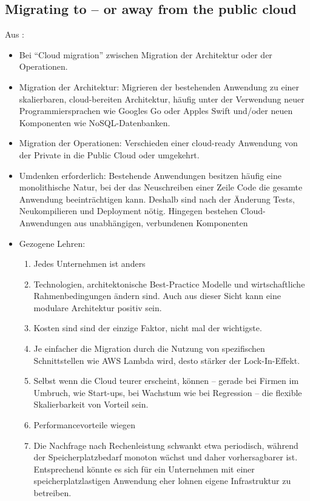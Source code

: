\subsection{Migrating to -- or away from the public cloud}
Aus :
\begin{itemize}
	\item Bei ``Cloud migration'' zwischen Migration der Architektur oder der Operationen.
	\item Migration der Architektur: Migrieren der bestehenden Anwendung zu einer skalierbaren, cloud-bereiten Architektur, häufig unter der Verwendung neuer Programmiersprachen wie Googles Go oder Apples Swift und/oder neuen Komponenten wie NoSQL-Datenbanken.
	\item Migration der Operationen: Verschieden einer cloud-ready Anwendung von der Private in die Public Cloud oder umgekehrt.
	\item Umdenken erforderlich: Bestehende Anwendungen besitzen häufig eine monolithische Natur, bei der das Neuschreiben einer Zeile Code die gesamte Anwendung beeinträchtigen kann. Deshalb sind nach der Änderung Tests, Neukompilieren und Deployment nötig. Hingegen bestehen Cloud-Anwendungen aus unabhängigen, verbundenen Komponenten
	\item Gezogene Lehren:
	\begin{enumerate}
		\item Jedes Unternehmen ist anders
		\item Technologien, architektonische Best-Practice Modelle und wirtschaftliche Rahmenbedingungen ändern sind. Auch aus dieser Sicht kann eine modulare Architektur positiv sein.
		\item Kosten sind sind der einzige Faktor, nicht mal der wichtigste.
		\item Je einfacher die Migration durch die Nutzung von spezifischen Schnittstellen wie AWS Lambda wird, desto stärker der Lock-In-Effekt.
		\item Selbst wenn die Cloud teurer erscheint, können -- gerade bei Firmen im Umbruch, wie Start-ups, bei Wachstum wie bei Regression -- die flexible Skalierbarkeit von Vorteil sein.
		\item Performancevorteile wiegen
		\item Die Nachfrage nach Rechenleistung schwankt etwa periodisch, während der Speicherplatzbedarf monoton wächst und daher vorhersagbarer ist. Entsprechend könnte es sich für ein Unternehmen mit einer speicherplatzlastigen Anwendung eher lohnen eigene Infrastruktur zu betreiben.
	\end{enumerate}
\end{itemize}


